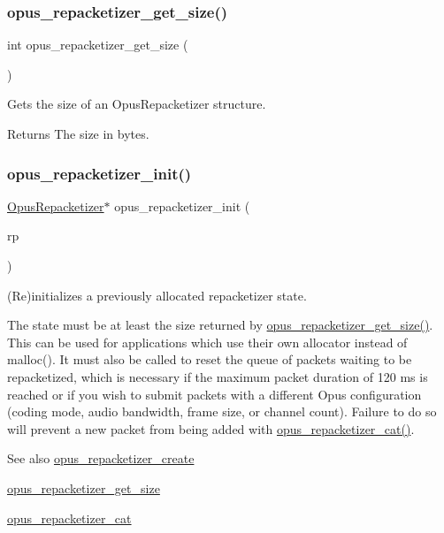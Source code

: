 \subsubsection{\texorpdfstring{opus\+\_\+repacketizer\+\_\+get\+\_\+size()}{opus\_repacketizer\_get\_size()}}
{\footnotesize\ttfamily int opus\+\_\+repacketizer\+\_\+get\+\_\+size (\begin{DoxyParamCaption}\item[{void}]{ }\end{DoxyParamCaption})}



Gets the size of an {\ttfamily Opus\+Repacketizer} structure. 

\begin{DoxyReturn}{Returns}
The size in bytes. 
\end{DoxyReturn}
\mbox{\label{group__opus__repacketizer_gab42ff7c3f8a49ff5029fcf60f3b853f0}} 
\subsubsection{\texorpdfstring{opus\+\_\+repacketizer\+\_\+init()}{opus\_repacketizer\_init()}}
{\footnotesize\ttfamily \hyperlink{group__opus__repacketizer_ga1f85070a64bcbf5bf24f5ccb80323e7b}{Opus\+Repacketizer}$\ast$ opus\+\_\+repacketizer\+\_\+init (\begin{DoxyParamCaption}\item[{\hyperlink{group__opus__repacketizer_ga1f85070a64bcbf5bf24f5ccb80323e7b}{Opus\+Repacketizer} $\ast$}]{rp }\end{DoxyParamCaption})}



(Re)initializes a previously allocated repacketizer state. 

The state must be at least the size returned by \hyperlink{group__opus__repacketizer_ga35c8fc05764748d187c62fc50e812d06}{opus\+\_\+repacketizer\+\_\+get\+\_\+size()}. This can be used for applications which use their own allocator instead of malloc(). It must also be called to reset the queue of packets waiting to be repacketized, which is necessary if the maximum packet duration of 120 ms is reached or if you wish to submit packets with a different Opus configuration (coding mode, audio bandwidth, frame size, or channel count). Failure to do so will prevent a new packet from being added with \hyperlink{group__opus__repacketizer_ga2840dd56bfa37f8c6874355b9ce8fb46}{opus\+\_\+repacketizer\+\_\+cat()}. \begin{DoxySeeAlso}{See also}
\hyperlink{group__opus__repacketizer_ga6f8813666ef851550ecf8658a731ff7d}{opus\+\_\+repacketizer\+\_\+create} 

\hyperlink{group__opus__repacketizer_ga35c8fc05764748d187c62fc50e812d06}{opus\+\_\+repacketizer\+\_\+get\+\_\+size} 

\hyperlink{group__opus__repacketizer_ga2840dd56bfa37f8c6874355b9ce8fb46}{opus\+\_\+repacketizer\+\_\+cat} 
\end{DoxySeeAlso}


